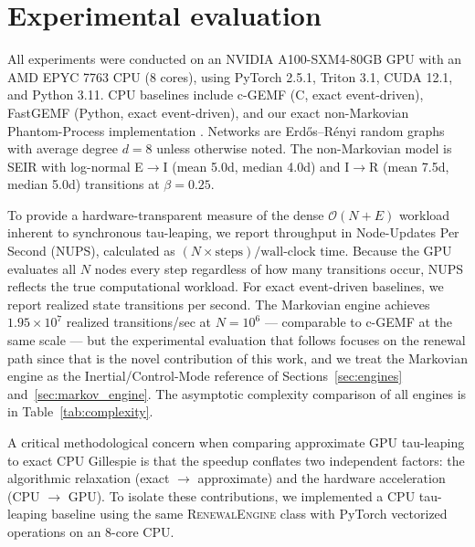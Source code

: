 \documentclass[a4paper,fleqn]{cas-sc}
\theoremstyle{definition}
\theoremstyle{remark}
\newcommand{\bigO}{\mathcal{O}}
\begin{document}
\section{Experimental evaluation}\label{sec:experiments}

All experiments were conducted on an NVIDIA A100-SXM4-80GB GPU with an AMD EPYC 7763 CPU (8 cores), using PyTorch 2.5.1, Triton 3.1, CUDA 12.1, and Python 3.11. CPU baselines include c-GEMF \citep{sahneh2017gemfsim} (C, exact event-driven), FastGEMF \citep{samaei2025fastgemf} (Python, exact event-driven), and our exact non-Markovian Phantom-Process implementation \citep{vajdi2020stochastic}. Networks are Erd\H{o}s--R\'{e}nyi random graphs with average degree $d = 8$ unless otherwise noted. The non-Markovian model is SEIR with log-normal E$\to$I (mean 5.0d, median 4.0d) and I$\to$R (mean 7.5d, median 5.0d) transitions at $\beta = 0.25$.

To provide a hardware-transparent measure of the dense $\bigO(N+E)$ workload inherent to synchronous tau-leaping, we report throughput in Node-Updates Per Second (NUPS), calculated as $(N \times \text{steps}) / \text{wall-clock time}$. Because the GPU evaluates all $N$ nodes every step regardless of how many transitions occur, NUPS reflects the true computational workload. For exact event-driven baselines, we report realized state transitions per second. The Markovian engine achieves $1.95 \times 10^7$ realized transitions/sec at $N=10^6$ --- comparable to c-GEMF \citep{sahneh2017gemfsim} at the same scale --- but the experimental evaluation that follows focuses on the renewal path since that is the novel contribution of this work, and we treat the Markovian engine as the Inertial/Control-Mode reference of Sections~\ref{sec:engines} and~\ref{sec:markov_engine}. The asymptotic complexity comparison of all engines is in Table~\ref{tab:complexity}.

A critical methodological concern when comparing approximate GPU tau-leaping to exact CPU Gillespie is that the speedup conflates two independent factors: the algorithmic relaxation (exact $\to$ approximate) and the hardware acceleration (CPU $\to$ GPU). To isolate these contributions, we implemented a CPU tau-leaping baseline using the same \textsc{RenewalEngine} class with PyTorch vectorized operations on an 8-core CPU.
\end{document}
